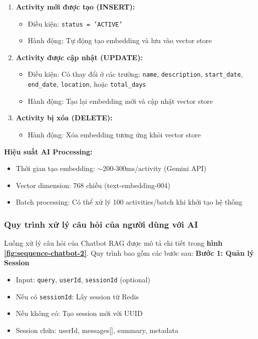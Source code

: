 \begin{enumerate}
    \item \textbf{Activity mới được tạo (INSERT):}
    \begin{itemize}
        \item Điều kiện: \texttt{status = 'ACTIVE'}
        \item Hành động: Tự động tạo embedding và lưu vào vector store
    \end{itemize}
    
    \item \textbf{Activity được cập nhật (UPDATE):}
    \begin{itemize}
        \item Điều kiện: Có thay đổi ở các trường: \texttt{name}, \texttt{description}, \texttt{start\_date}, \texttt{end\_date}, \texttt{location}, hoặc \texttt{total\_days}
        \item Hành động: Tạo lại embedding mới và cập nhật vector store
    \end{itemize}
    
    \item \textbf{Activity bị xóa (DELETE):}
    \begin{itemize}
        \item Hành động: Xóa embedding tương ứng khỏi vector store
    \end{itemize}
\end{enumerate}

\textbf{Hiệu suất AI Processing:}
\begin{itemize}
    \item Thời gian tạo embedding: $\sim$200-300ms/activity (Gemini API)
    \item Vector dimension: 768 chiều (text-embedding-004)
    \item Batch processing: Có thể xử lý 100 activities/batch khi khởi tạo hệ thống
\end{itemize}

\subsubsection{Quy trình xử lý câu hỏi của người dùng với AI}
Luồng xử lý câu hỏi của Chatbot RAG được mô tả chi tiết trong \textbf{hình \ref{fig:sequence-chatbot-2}}. Quy trình bao gồm các bước sau:
\textbf{Bước 1: Quản lý Session}
\begin{itemize}
    \item Input: \texttt{query}, \texttt{userId}, \texttt{sessionId} (optional)
    \item Nếu có \texttt{sessionId}: Lấy session từ Redis
    \item Nếu không có: Tạo session mới với UUID
    \item Session chứa: userId, messages[], summary, metadata
\end{itemize}


